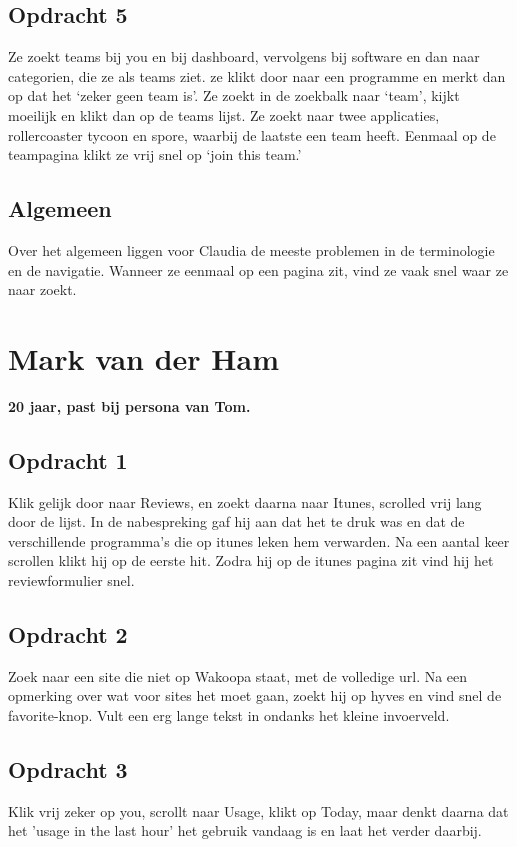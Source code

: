 \subsection{Opdracht 5}
 Ze zoekt teams bij you en bij dashboard, vervolgens bij software en dan naar categorien, die ze als teams ziet. ze klikt door naar een programme en merkt dan op dat het `zeker geen team is'. Ze zoekt in de zoekbalk naar `team', kijkt moeilijk en klikt dan op de teams lijst. Ze zoekt naar twee applicaties, rollercoaster tycoon en spore, waarbij de laatste een team heeft. Eenmaal op de teampagina klikt ze vrij snel op `join this team.'

 \subsection{Algemeen}
  Over het algemeen liggen voor Claudia de meeste problemen in de terminologie en de navigatie. Wanneer ze eenmaal op een pagina zit, vind ze vaak snel waar ze naar zoekt.

\section{Mark van der Ham}
\textbf{20 jaar, past bij persona van Tom.}

\subsection{Opdracht 1}
Klik gelijk door naar Reviews, en zoekt daarna naar Itunes, scrolled vrij lang door de lijst. In de nabespreking gaf hij aan dat het te druk was en dat de verschillende programma's die op itunes leken hem verwarden. Na een aantal keer scrollen klikt hij op de eerste hit. Zodra hij op de itunes pagina zit vind hij het reviewformulier snel.

\subsection{Opdracht 2}
Zoek naar een site die niet op Wakoopa staat, met de volledige url. Na een opmerking over wat voor sites het moet gaan, zoekt hij op hyves en vind snel de favorite-knop. Vult een erg lange tekst in ondanks het kleine invoerveld.

\subsection{Opdracht 3}
Klik vrij zeker op you, scrollt naar Usage, klikt op Today, maar denkt daarna dat het 'usage in the last hour' het gebruik vandaag is en laat het verder daarbij.

